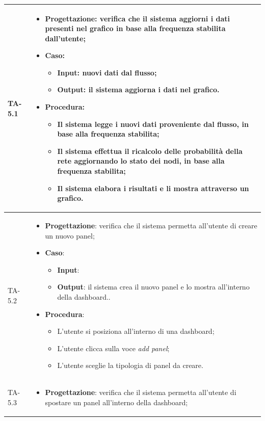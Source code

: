 \begin{longtable}{|C{2.5cm}|C{13cm}|}
{TA-5.1} &
\begin{itemize}
	\item \textbf{Progettazione}: verifica che il sistema aggiorni i dati presenti nel grafico in base alla frequenza stabilita dall'utente;
	\item \textbf{Caso}: 
	\begin{itemize}
		\item \textbf{Input}: nuovi dati dal flusso;
		\item \textbf{Output}: il sistema aggiorna i dati nel grafico.
	\end{itemize}
	\item \textbf{Procedura}:
	\begin{itemize}
		\item Il sistema legge i nuovi dati proveniente dal flusso, in base alla frequenza stabilita;
		\item Il sistema effettua il ricalcolo delle probabilità della rete aggiornando lo stato dei nodi, in base alla frequenza stabilita;
		\item Il sistema elabora i risultati e li mostra attraverso un grafico.
	\end{itemize} 
\end{itemize} \\
\hline
{TA-5.2} &
\begin{itemize}
	\item \textbf{Progettazione}: verifica che il sistema permetta all'utente di creare un nuovo panel;
	\item \textbf{Caso}: 
	\begin{itemize}
		\item \textbf{Input}:
		\item \textbf{Output}: il sistema crea il nuovo panel e lo mostra all'interno della dashboard..
	\end{itemize}
	\item \textbf{Procedura}:
	\begin{itemize}
		\item L'utente si posiziona all'interno di una dashboard;
		\item L'utente clicca sulla voce \emph{add panel};
		\item L'utente sceglie la tipologia di panel da creare.
	\end{itemize} 
\end{itemize} \\
\hline
{TA-5.3} &
\begin{itemize}
	\item \textbf{Progettazione}: verifica che il sistema permetta all'utente di spostare un panel all'interno della dashboard;

\end{itemize}
\end{longtable}
